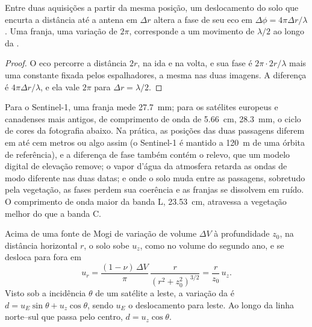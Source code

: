\begin{theorem}\label{thm:b3:remote-sensing-gis:fringe}
Entre duas aquisições a partir da mesma posição, um deslocamento do
solo que encurta a distância até a antena em $\Delta r$ altera a
fase de seu eco em $\Delta\phi = 4\pi\Delta r/\lambda$. Uma franja, uma
variação de $2\pi$, corresponde a um movimento de $\lambda/2$ ao longo da .
\end{theorem}

\begin{proof}
O eco percorre a distância $2r$, na ida e na volta, e sua fase é
$2\pi\cdot 2r/\lambda$ mais uma constante fixada pelos espalhadores, a mesma nas
duas imagens. A diferença é $4\pi\Delta r/\lambda$, e ela vale $2\pi$
para $\Delta r = \lambda/2$.
\end{proof}

Para o Sentinel-1, uma franja mede \qty{27.7}{mm}; para os satélites europeus e
canadenses mais antigos, de comprimento de onda de \qty{5.66}{cm}, \qty{28.3}{mm}, o
ciclo de cores da fotografia abaixo. Na prática, as posições das
duas passagens diferem em até cem metros ou algo assim (o Sentinel-1 é mantido
a \qty{120}{m} de uma órbita de referência), e a diferença de fase
também contém o relevo, que um modelo digital de elevação remove; o
vapor d'água da atmosfera retarda as ondas de modo diferente nas duas datas;
e onde o solo muda entre as passagens, sobretudo pela vegetação, as
fases perdem sua coerência e as franjas se dissolvem em ruído. O comprimento de onda
maior da banda L, \qty{23.53}{cm}, atravessa a vegetação melhor do que a
banda C.

\begin{proposition}\label{prop:b3:remote-sensing-gis:mogi-los}
Acima de uma fonte de Mogi de variação de volume $\Delta V$ à profundidade $z_0$, na
distância horizontal $r$, o solo sobe $u_z$, como no volume do segundo ano,
e se desloca para fora em
\[
u_r = \frac{(1 - \nu)\,\Delta V}{\pi}\,\frac{r}{(r^2 + z_0^2)^{3/2}} = \frac{r}{z_0}\,u_z .
\]
Visto sob a incidência $\theta$ de um satélite a leste, a variação da
 é $d = u_E\sin\theta + u_z\cos\theta$, sendo $u_E$ o
deslocamento para leste. Ao longo da linha norte--sul que passa pelo centro,
$d = u_z\cos\theta$.
\end{proposition}

